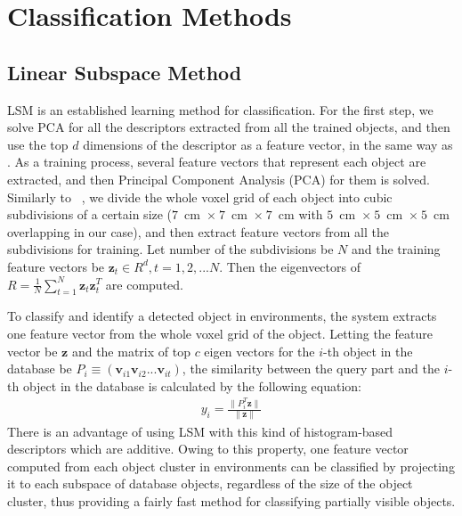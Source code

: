 \documentclass[a4paper, 10 pt, conference]{sty/ieeeconf}
\begin{document}
\section{Classification Methods}
\label{sec:classification}

\subsection{Linear Subspace Method}
\label{sec:subspace}
LSM is an established learning method for classification. 
For the first step, we solve PCA for all the descriptors extracted from all the trained objects, 
and then use the top $d$ dimensions of the descriptor as a feature vector, in the same way as \cite{kanezaki2011icra}.
As a training process, several feature vectors that represent each object are extracted, 
and then Principal Component Analysis (PCA) for them is solved. 
Similarly to ~\cite{kanezaki2011icra}, we divide the whole voxel grid of each object into 
cubic subdivisions of a certain size ($7$~cm~$\times~7$~cm~$\times~7$~cm with $5$~cm~$\times~5$~cm~$\times~5$~cm overlapping in our case), and then extract feature vectors from all the subdivisions for training. 
Let number of the subdivisions be $N$ 
and the training feature vectors be $\bm{z}_t \in R^d, t=1,2,...N$. 
Then the eigenvectors of $R=\frac{1}{N} \sum^{N}_{t=1} \bm{z}_t \bm{z}_t^T$ are computed. 

To classify and identify a detected object in environments, the system extracts one feature vector from the whole voxel grid of the object. 
Letting the feature vector be $\bm{z}$ and the matrix of top $c$ eigen vectors for the $i$-th object in the database be $P_i \equiv (\bm{v}_{i1} \bm{v}_{i2} ... \bm{v}_{it})$,
the similarity between the query part and the $i$-th object in the database is calculated by the following equation:
\begin{eqnarray}\label{eq:y_calc}
  y_i = \frac{\| P_i^T \bm{z} \|}{\| \bm{z} \|}
\end{eqnarray}
There is an advantage of using LSM with this kind of histogram-based descriptors which are additive. 
Owing to this property, one feature vector computed from each object cluster in environments can be classified by projecting it to 
each subspace of database objects, regardless of the size of the object cluster, thus providing a fairly fast method for classifying partially visible objects.
\end{document}
